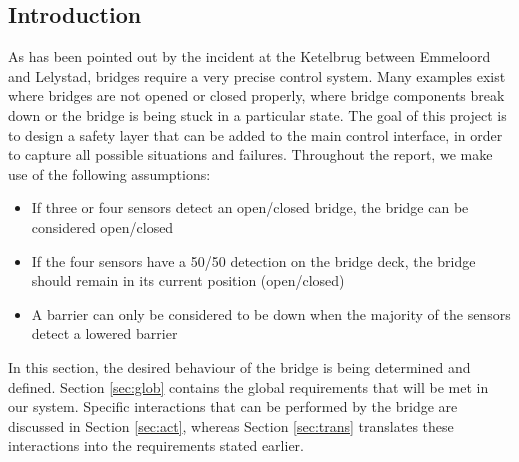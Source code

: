 \subsection{Introduction}

As has been pointed out by the incident at the Ketelbrug between Emmeloord and
Lelystad, bridges require a very precise control system.  Many examples exist
where bridges are not opened or closed properly, where bridge components break
down or the bridge is being stuck in a particular state. The goal of this
project is to design a safety layer that can be added to the main control
interface, in order to capture all possible situations and failures.
Throughout the report, we make use of the following assumptions:
%
\begin{itemize}
	\item If three or four sensors detect an open/closed bridge, the bridge can be considered open/closed
	\item If the four sensors	 have a 50/50 detection on the bridge deck, the bridge should remain in its current position (open/closed)
	\item A barrier can only be considered to be down when the majority of the sensors detect a lowered barrier
\end{itemize}
%
In this section, the desired behaviour of the bridge is being determined and defined. Section \ref{sec:glob} contains the global requirements that will be met in our system. Specific interactions that can be performed by the bridge are discussed in Section \ref{sec:act}, whereas Section \ref{sec:trans} translates these interactions into the requirements stated earlier.

